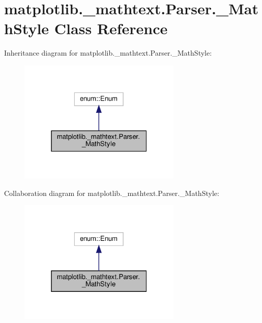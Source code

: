 \hypertarget{classmatplotlib_1_1__mathtext_1_1Parser_1_1__MathStyle}{}\section{matplotlib.\+\_\+mathtext.\+Parser.\+\_\+\+Math\+Style Class Reference}
\label{classmatplotlib_1_1__mathtext_1_1Parser_1_1__MathStyle}


Inheritance diagram for matplotlib.\+\_\+mathtext.\+Parser.\+\_\+\+Math\+Style\+:
\nopagebreak
\begin{figure}[H]
\begin{center}
\leavevmode
\includegraphics[width=220pt]{classmatplotlib_1_1__mathtext_1_1Parser_1_1__MathStyle__inherit__graph}
\end{center}
\end{figure}


Collaboration diagram for matplotlib.\+\_\+mathtext.\+Parser.\+\_\+\+Math\+Style\+:
\nopagebreak
\begin{figure}[H]
\begin{center}
\leavevmode
\includegraphics[width=220pt]{classmatplotlib_1_1__mathtext_1_1Parser_1_1__MathStyle__coll__graph}
\end{center}
\end{figure}
